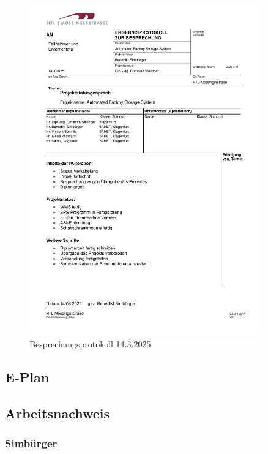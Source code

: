 \begin{figure}[H]
    \includegraphics[width=0.9\textwidth]{../Protokolls/Projektbesprechung_3.pdf}
    \centering
    \caption{Besprechungsprotokoll 14.3.2025}
\end{figure}




\newpage

\subsection{E-Plan}



\subsection{Arbeitsnachweis}

\subsubsection{Simbürger}

